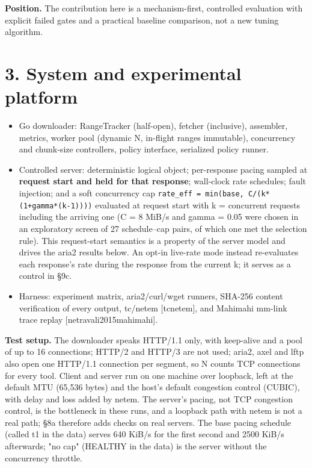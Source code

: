\documentclass[10pt,a4paper]{article}
\begin{document}
\textbf{Position.} The contribution here is a mechanism-first, controlled evaluation with explicit failed gates and a practical baseline comparison, not a new tuning algorithm.


\section*{3. System and experimental platform}

\begin{itemize}
\item Go downloader: RangeTracker (half-open), fetcher (inclusive), assembler, metrics, worker pool (dynamic N, in-flight ranges immutable), concurrency and chunk-size controllers, policy interface, serialized policy runner.
\item Controlled server: deterministic logical object; per-response pacing sampled at \textbf{request start and held for that response}; wall-clock rate schedules; fault injection; and a soft concurrency cap \texttt{rate\_eff = min(base, C/\allowbreak{}(k*(1+gamma*(k-1))))} evaluated at request start with k = concurrent requests including the arriving one (C = 8 MiB/s and gamma = 0.05 were chosen in an exploratory screen of 27 schedule–cap pairs, of which one met the selection rule). This request-start semantics is a property of the server model and drives the aria2 results below. An opt-in live-rate mode instead re-evaluates each response's rate during the response from the current k; it serves as a control in §9c.
\item Harness: experiment matrix, aria2/curl/wget runners, SHA-256 content verification of every output, tc/netem [tcnetem], and Mahimahi mm-link trace replay [netravali2015mahimahi].
\end{itemize}

\textbf{Test setup.} The downloader speaks HTTP/1.1 only, with keep-alive and a pool of up to 16 connections; HTTP/2 and HTTP/3 are not used; aria2, axel and lftp also open one HTTP/1.1 connection per segment, so N counts TCP connections for every tool. Client and server run on one machine over loopback, left at the default MTU (65,536 bytes) and the host's default congestion control (CUBIC), with delay and loss added by netem. The server's pacing, not TCP congestion control, is the bottleneck in these runs, and a loopback path with netem is not a real path; §8a therefore adds checks on real servers. The base pacing schedule (called t1 in the data) serves 640 KiB/s for the first second and 2500 KiB/s afterwards; "no cap" (HEALTHY in the data) is the server without the concurrency throttle.
\end{document}
